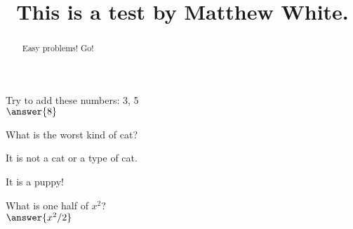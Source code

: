 \documentclass{ximera}
\title{This is a test by Matthew White.}
\begin{document}
	\begin{abstract}
		Easy problems! Go!
	\end{abstract}
	\maketitle
	
	
\begin{question}
	Try to add these numbers: 3, 5\\
	$\answer{8}$
\end{question}
	
\begin{question}
	What is the worst kind of cat?
	\begin{prompt}
		\begin{multipleChoice}
		\end{multipleChoice}
	\end{prompt}
	\begin{hint}
		It is not a cat or a type of cat.
	\end{hint}
	\begin{hint}
		It is a puppy!
	\end{hint}
\end{question}

	

	\begin{question}
		What is one half of $x^2$?\\
		$	\answer{x^2/2}$
	\end{question}

	
\end{document}

